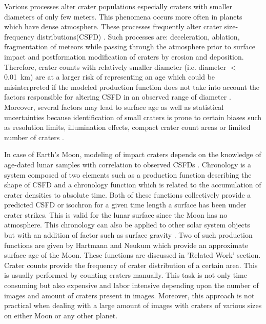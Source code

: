 \documentclass[11pt]{article}
\begin{document}
Various processes alter crater populations especially craters with smaller diameters of only few meters. This phenomena occurs more often in planets which have dense atmosphere. These processes frequently alter crater size-frequency distributions(CSFD) \cite{opik1965mariner}. Such processes are: deceleration, ablation, fragmentation of meteors while passing through the atmosphere prior to surface impact and postformation modification of craters by erosion and deposition. Therefore, crater counts with relatively smaller diameter (i.e. diameter $<$ \SI{0.01}{\kilo\metre}) are at a larger risk of representing an age which could be misinterpreted if the modeled production function does not take into account the factors responsible for altering CSFD in an observed range of diameter \cite{hartmann1981chronology}. Moreover, several factors may lead to surface age as well as statistical uncertainties because identification of small craters is prone to certain biases such as resolution limits, illumination effects, compact crater count areas or limited number of craters \cite{soderblom1970distribution}.

In case of Earth's Moon, modeling of impact craters depends on the knowledge of age-dated lunar samples with correlation to observed CSFDs \cite{williams2018dating}. Chronology is a system composed of two elements such as a production function describing the shape of CSFD and a chronology function which is related to the accumulation of crater densities to absolute time. Both of these functions collectively provide a predicted CSFD or isochron for a given time length a surface has been under crater strikes. This is valid for the lunar surface since the Moon has no atmosphere. This chronology can also be applied to other solar system objects but with an addition of factor such as surface gravity \cite{ivanov2002comparison}. Two of such production functions are given by Hartmann and Neukum which provide an approximate surface age of the Moon. These functions are discussed in 'Related Work' section. Crater counts provide the frequency of crater distribution of a certain area. This is usually performed by counting craters manually. This task is not only time consuming but also expensive and labor intensive depending upon the number of images and amount of craters present in images. Moreover, this approach is not practical when dealing with a large amount of images with craters of various sizes on either Moon or any other planet. 

\end{document}
